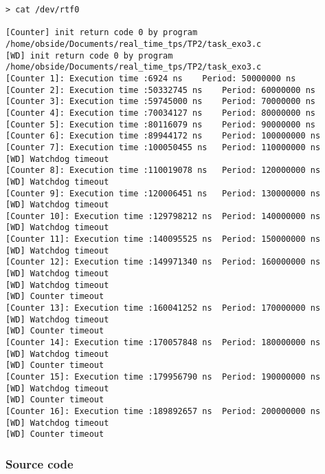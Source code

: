 \begin{lstlisting}
> cat /dev/rtf0

[Counter] init return code 0 by program /home/obside/Documents/real_time_tps/TP2/task_exo3.c
[WD] init return code 0 by program /home/obside/Documents/real_time_tps/TP2/task_exo3.c
[Counter 1]: Execution time :6924 ns	Period: 50000000 ns
[Counter 2]: Execution time :50332745 ns	Period: 60000000 ns
[Counter 3]: Execution time :59745000 ns	Period: 70000000 ns
[Counter 4]: Execution time :70034127 ns	Period: 80000000 ns
[Counter 5]: Execution time :80116079 ns	Period: 90000000 ns
[Counter 6]: Execution time :89944172 ns	Period: 100000000 ns
[Counter 7]: Execution time :100050455 ns	Period: 110000000 ns
[WD] Watchdog timeout
[Counter 8]: Execution time :110019078 ns	Period: 120000000 ns
[WD] Watchdog timeout
[Counter 9]: Execution time :120006451 ns	Period: 130000000 ns
[WD] Watchdog timeout
[Counter 10]: Execution time :129798212 ns	Period: 140000000 ns
[WD] Watchdog timeout
[Counter 11]: Execution time :140095525 ns	Period: 150000000 ns
[WD] Watchdog timeout
[Counter 12]: Execution time :149971340 ns	Period: 160000000 ns
[WD] Watchdog timeout
[WD] Watchdog timeout
[WD] Counter timeout
[Counter 13]: Execution time :160041252 ns	Period: 170000000 ns
[WD] Watchdog timeout
[WD] Counter timeout
[Counter 14]: Execution time :170057848 ns	Period: 180000000 ns
[WD] Watchdog timeout
[WD] Counter timeout
[Counter 15]: Execution time :179956790 ns	Period: 190000000 ns
[WD] Watchdog timeout
[WD] Counter timeout
[Counter 16]: Execution time :189892657 ns	Period: 200000000 ns
[WD] Watchdog timeout
[WD] Counter timeout
\end{lstlisting}

\subsubsection{Source code}


